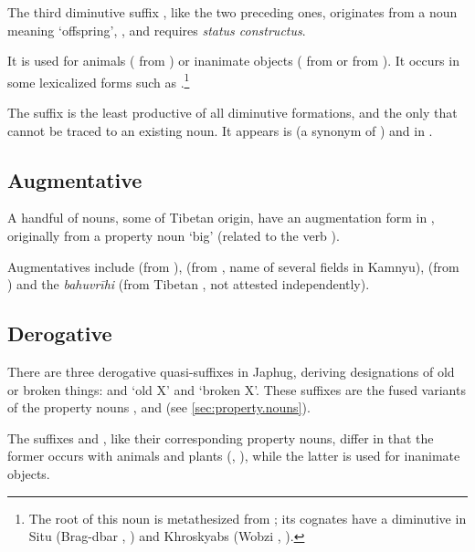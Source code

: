 The third diminutive suffix , like the two preceding ones, originates from a noun meaning `offspring', , and requires \textit{status constructus}.

It is  used for animals ( from ) or inanimate objects ( from  or  from ). It occurs in some lexicalized forms such as .\footnote{The root of this noun is metathesized from ; its cognates have a  diminutive in Situ (Brag-dbar , \citealt[228]{zhang16bragdbar}) and Khroskyabs (Wobzi , \citealt[115]{lai17khroskyabs}).}

The suffix  is the least productive of all diminutive formations, and the only that cannot be traced to an existing noun. It appears is  (a synonym of ) and in .

\subsection{Augmentative} \label{sec:augmentative}
A handful of nouns, some of Tibetan origin, have an augmentation form in , originally from a property noun  `big' (related to the verb ).

Augmentatives include  (from ),  (from , name of several fields in Kamnyu),  (from ) and the \textit{bahuvrīhi}  (from Tibetan , not attested independently).

\subsection{Derogative} \label{sec:derogative}
There are three derogative quasi-suffixes in Japhug, deriving designations of old or broken things:  and  `old X' and  `broken X'. These suffixes are the fused variants of the property nouns ,  and   (see \ref{sec:property.nouns}). 

The suffixes  and , like their corresponding property nouns, differ in that the former occurs with animals and plants (, ), while the latter is used for inanimate objects.

